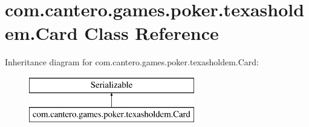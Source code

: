 \hypertarget{classcom_1_1cantero_1_1games_1_1poker_1_1texasholdem_1_1_card}{}\section{com.\+cantero.\+games.\+poker.\+texasholdem.\+Card Class Reference}
\label{classcom_1_1cantero_1_1games_1_1poker_1_1texasholdem_1_1_card}
Inheritance diagram for com.\+cantero.\+games.\+poker.\+texasholdem.\+Card\+:\begin{figure}[H]
\begin{center}
\leavevmode
\includegraphics[height=2.000000cm]{classcom_1_1cantero_1_1games_1_1poker_1_1texasholdem_1_1_card}
\end{center}
\end{figure}

